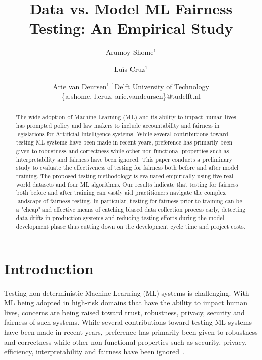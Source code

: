 \documentclass{article}
\title{Data vs. Model ML Fairness Testing: An Empirical Study}
\author{
  Arumoy Shome$^1$
  \and
  Lu{\'\i}s Cruz$^1$\and
  Arie van Deursen$^{1}$
  \affiliations
  $^1$Delft University of Technology\\
  \emails
  \{a.shome, l.cruz, arie.vandeursen\}@tudelft.nl
}
\begin{document}
\maketitle

\begin{abstract}
  The wide adoption of Machine Learning (ML) and its ability to impact
  human lives has prompted policy and law makers to include
  accountability and fairness in legislations for Artificial
  Intelligence systems. While several contributions toward testing ML
  systems have been made in recent years, preference has primarily
  been given to robustness and correctness while other non-functional
  properties such as interpretability and fairness have been
  ignored. This paper conducts a preliminary study to evaluate the
  effectiveness of testing for fairness both before and after model
  training. The proposed testing methodology is evaluated empirically
  using five real-world datasets and four ML algorithms. Our results
  indicate that testing for fairness both before and after training
  can vastly aid practitioners navigate the complex landscape of
  fairness testing. In particular, testing for fairness prior to
  training can be a "cheap" and effective means of catching biased
  data collection process early, detecting data drifts in production
  systems and reducing testing efforts during the model development
  phase thus cutting down on the development cycle time and project
  costs.
\end{abstract}

\section{Introduction}\label{sec:intro}


Testing non-deterministic Machine Learning (ML) systems is
challenging. With ML being adopted in high-risk domains that have the
ability to impact human lives, concerns are being raised toward trust,
robustness, privacy, security and fairness of such systems. While
several contributions toward testing ML systems have been made in
recent years, preference has primarily been given to robustness and
correctness while other non-functional properties such as security,
privacy, efficiency, interpretability and fairness have been
ignored \cite{zhang2020machine,zhang2021ignorance,mehrabi2021survey,wan2021modeling}.
\end{document}

